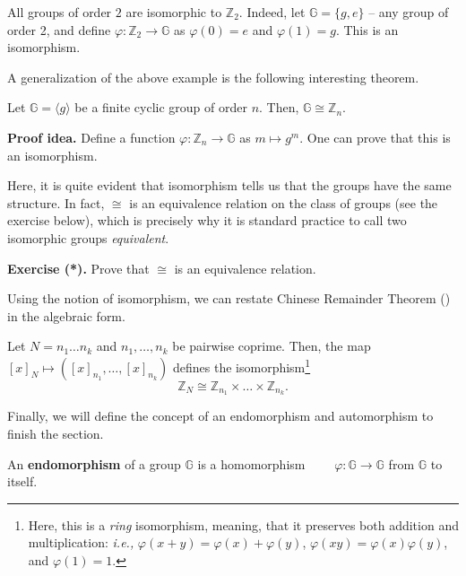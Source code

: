 \documentclass[../../book.tex]{subfiles}
\begin{document}
\begin{example}
    All groups of order $2$ are isomorphic to $\mathbb{Z}_2$. Indeed, let $\mathbb{G} = \{g,e\}$ -- any group of order 2, and define $\varphi: \mathbb{Z}_2 \to \mathbb{G}$ as $\varphi(0) = e$ and $\varphi(1) = g$. This is an isomorphism.
\end{example}

A generalization of the above example is the following interesting theorem.

\begin{theorem}\label{th:cyclic-group-isomorphism}
    Let $\mathbb{G} = \langle g \rangle$ be a finite cyclic group of order $n$. Then, $\mathbb{G} \cong \mathbb{Z}_n$.
\end{theorem}

\textbf{Proof idea.} Define a function $\varphi: \mathbb{Z}_n \to \mathbb{G}$ as $m \mapsto g^m$. One can prove that this is an isomorphism.

Here, it is quite evident that isomorphism tells us that the groups have the same structure. 
In fact, $\cong$ is an equivalence relation on the class of groups
(see the exercise below), which is precisely why it is standard
practice to call two isomorphic groups \textit{equivalent}.

\textbf{Exercise (*).} Prove that $\cong$ is an equivalence relation.

Using the notion of isomorphism, we can restate Chinese Remainder Theorem () in the algebraic form.
\begin{theorem}
    Let $N=n_1\dots n_k$ and $n_1,\dots,n_k$ be pairwise coprime. Then, the map
    $[x]_N \mapsto ([x]_{n_1}, \dots, [x]_{n_k})$ defines the isomorphism\footnote{Here, this is a \textit{ring} isomorphism, meaning, that it preserves both addition and multiplication: \textit{i.e.,} $\varphi(x+y)=\varphi(x)+\varphi(y)$, $\varphi(xy)=\varphi(x)\varphi(y)$, and $\varphi(1)=1$.}
    \begin{equation*}
        \mathbb{Z}_N \cong \mathbb{Z}_{n_1} \times \dots \times \mathbb{Z}_{n_k}.
    \end{equation*}
\end{theorem} 

Finally, we will define the concept of an endomorphism and automorphism to finish the section.

\begin{definition}
    An \textbf{endomorphism} of a group $\mathbb{G}$ is a homomorphism $\qquad \varphi: \mathbb{G} \to \mathbb{G}$
    from $\mathbb{G}$ to itself.
\end{definition}
\end{document}
